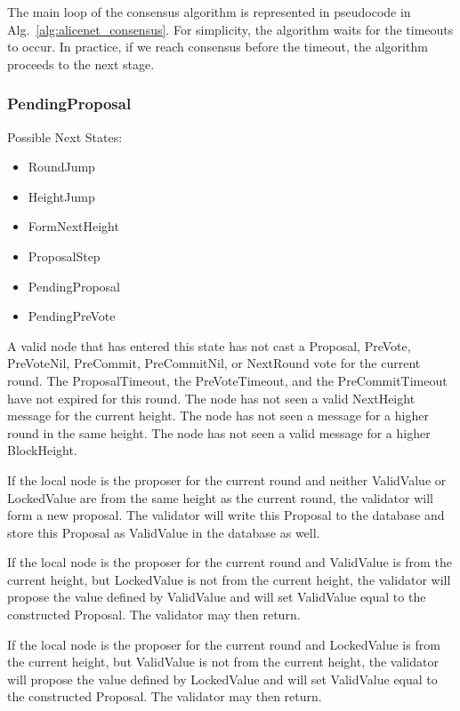 The main loop of the consensus algorithm is represented
in pseudocode in Alg.~\ref{alg:alicenet_consensus}.
For simplicity, the algorithm waits for the timeouts to occur.
In practice, if we reach consensus before the timeout,
the algorithm proceeds to the next stage.


\afterpage{\clearpage}


\subsubsection{PendingProposal}

Possible Next States:

\begin{itemize}
    \item RoundJump
    \item HeightJump
    \item FormNextHeight
    \item ProposalStep
    \item PendingProposal
    \item PendingPreVote
\end{itemize}

A valid node that has entered this state has not cast a Proposal,
PreVote, PreVoteNil, PreCommit, PreCommitNil, or NextRound vote for the
current round.
The ProposalTimeout, the PreVoteTimeout, and the
PreCommitTimeout have not expired for this round.
The node has not seen a valid NextHeight message for the current height.
The node has not seen a message for a higher round in the same height.
The node has not seen a valid message for a higher BlockHeight.

If the local node is the proposer for the current round and neither
ValidValue or LockedValue are from the same height as the current
round, the validator will form a new proposal.
The validator will write this Proposal to the database and store this
Proposal as ValidValue in the database as well.

If the local node is the proposer for the current round and ValidValue
is from the current height, but LockedValue is not from the current
height, the validator will propose the value defined by ValidValue and
will set ValidValue equal to the constructed Proposal.
The validator may then return.

If the local node is the proposer for the current round and LockedValue
is from the current height, but ValidValue is not from the current
height, the validator will propose the value defined by LockedValue and
will set ValidValue equal to the constructed Proposal.
The validator may then return.

